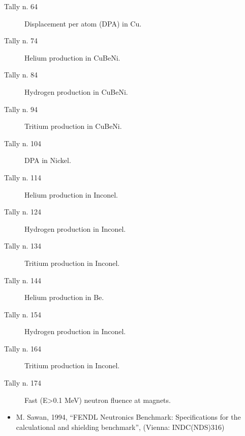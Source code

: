 \documentclass[letterpaper,10pt,english]{sphinxmanual}
\begin{document}
\begin{description}
\item[{Tally n. 64}] \leavevmode
\sphinxAtStartPar
Displacement per atom (DPA) in Cu.

\item[{Tally n. 74}] \leavevmode
\sphinxAtStartPar
Helium production in CuBeNi.

\item[{Tally n. 84}] \leavevmode
\sphinxAtStartPar
Hydrogen production in CuBeNi.

\item[{Tally n. 94}] \leavevmode
\sphinxAtStartPar
Tritium production in CuBeNi.

\item[{Tally n. 104}] \leavevmode
\sphinxAtStartPar
DPA in Nickel.

\item[{Tally n. 114}] \leavevmode
\sphinxAtStartPar
Helium production in Inconel.

\item[{Tally n. 124}] \leavevmode
\sphinxAtStartPar
Hydrogen production in Inconel.

\item[{Tally n. 134}] \leavevmode
\sphinxAtStartPar
Tritium production in Inconel.

\item[{Tally n. 144}] \leavevmode
\sphinxAtStartPar
Helium production in Be.

\item[{Tally n. 154}] \leavevmode
\sphinxAtStartPar
Hydrogen production in Inconel.

\item[{Tally n. 164}] \leavevmode
\sphinxAtStartPar
Tritium production in Inconel.

\item[{Tally n. 174}] \leavevmode
\sphinxAtStartPar
Fast (E\textgreater{}0.1 MeV) neutron fluence at magnets.

\end{description}


\nopagebreak


\sphinxAtStartPar
{}
\begin{itemize}
\item {} 
\sphinxAtStartPar
M. Sawan, 1994,  “FENDL Neutronics Benchmark: Specifications for the calculational and shielding benchmark”,
(Vienna: INDC(NDS)\sphinxhyphen{}316)

\end{itemize}
\end{document}
